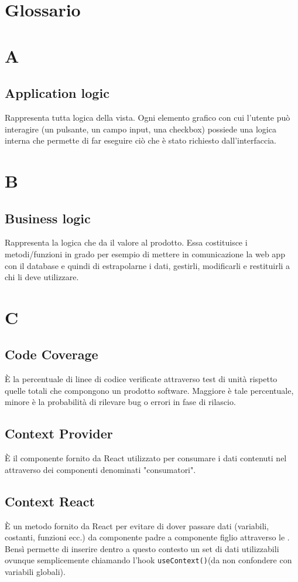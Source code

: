 \appendix
\section{Glossario}
\section*{A}
\subsection*{Application logic}
Rappresenta tutta logica della vista. Ogni elemento grafico con cui l'utente può interagire (un pulsante, un campo input, una checkbox) possiede una logica interna che permette di far eseguire ciò che è stato richiesto dall'interfaccia. 

\section*{B}
\subsection*{Business logic}
Rappresenta la logica che da il valore al prodotto. Essa costituisce i metodi/funzioni in grado per esempio di mettere in comunicazione la web app con il database e quindi di estrapolarne i dati, gestirli, modificarli e restituirli a chi li deve utilizzare.

\section*{C}
\subsection*{Code Coverage}
È la percentuale di linee di codice verificate attraverso test di unità rispetto quelle totali che compongono un prodotto software. Maggiore è tale percentuale, minore è la probabilità di rilevare bug o errori in fase di rilascio.

\subsection*{Context Provider}
È il componente fornito da React utilizzato per consumare i dati contenuti nel  attraverso dei componenti denominati "consumatori".

\subsection*{Context React}
È un metodo fornito da React per evitare di dover passare dati (variabili, costanti, funzioni ecc.) da componente padre a componente figlio attraverso le . Bensì permette di inserire dentro a questo contesto un set di dati utilizzabili ovunque semplicemente chiamando l'hook \texttt{useContext()}(da non confondere con variabili globali).

